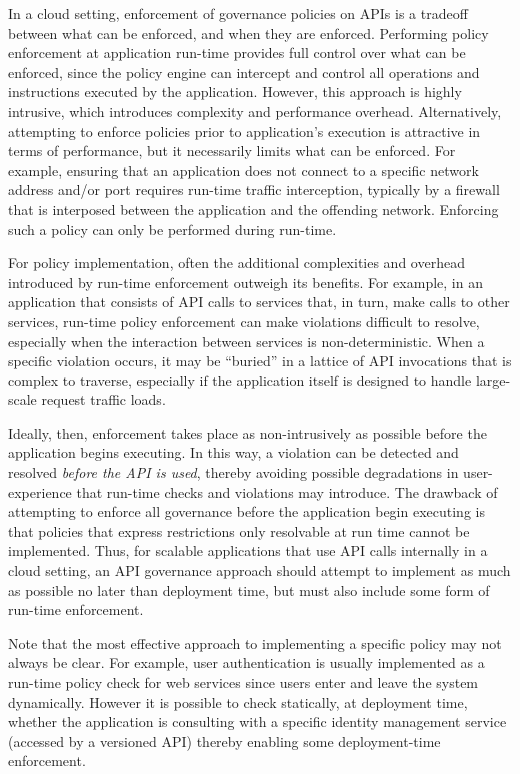 In a cloud setting, enforcement of governance policies on APIs is a tradeoff between
what can be enforced, and when they are enforced. Performing policy enforcement
at application run-time provides full control over what can be enforced, since the policy 
engine can intercept and control all operations and instructions executed by the application.
However, this approach is highly intrusive, which introduces complexity and performance
overhead. Alternatively, attempting to enforce policies prior to application's execution is
attractive in terms of performance, but it necessarily limits what can 
be enforced. For example, ensuring that an
application does not connect to a specific network address and/or port
requires run-time traffic interception, typically by a firewall that is
interposed between the application and the offending network. Enforcing such a policy
can only be performed during run-time.

For policy implementation, often the additional complexities and overhead
introduced by run-time enforcement outweigh its benefits.  For example, in an
application that consists of API calls to services that, in turn, make calls
to other services, run-time policy enforcement can make violations difficult
to resolve, especially when the interaction between services is
non-deterministic.  When a specific violation occurs, it may be ``buried'' in a
lattice of API invocations that is complex to traverse, especially if the
application itself is designed to handle large-scale request traffic loads.

Ideally, then, enforcement takes place as non-intrusively as possible before
the application begins executing.  In this way, a violation can be detected and
resolved \textit{before the API is used}, thereby avoiding possible
degradations in user-experience that run-time checks and violations may
introduce.  The drawback of attempting to enforce all governance before the
application begin executing is that policies that express restrictions only
resolvable at run time cannot be implemented.  
Thus, for scalable applications that use API calls internally in a cloud
setting, an API governance approach should attempt to implement as much as
possible no later than deployment time, but must also include some form of
run-time enforcement.  

Note that the most effective approach to implementing a specific policy may not
always be clear.  For example, user authentication is usually implemented as a
run-time policy check for web services since users enter and leave the system dynamically.
However it is possible to check statically, at deployment time, whether the
application is consulting with a specific identity management service (accessed
by a versioned API) thereby enabling some deployment-time enforcement.

